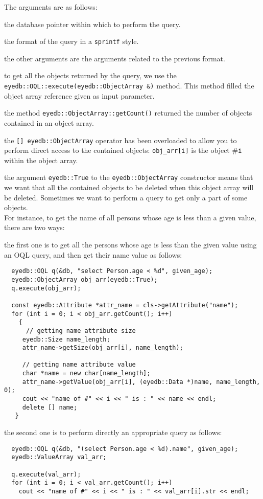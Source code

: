 The arguments are as follows:
\be
\item the database pointer within which to perform the query.
\item the format of the query in a \texttt{sprintf} style.
\item the other arguments are the arguments related to the previous
format.
\ee
\item to get all the objects returned by the query, we use the
\texttt{eyedb::OQL::execute(eyedb::ObjectArray \&)} method. This method filled
the object array reference given as input parameter.
\item the method \texttt{eyedb::ObjectArray::getCount()} returned the number
of objects contained in an object array.
\item the \texttt{[] eyedb::ObjectArray} operator has been overloaded to
allow you to perform direct access to the contained objects: \texttt{obj\_arr[i]} is
the object \#\texttt{i} within the object array.
\item the argument \texttt{eyedb::True} to the \texttt{eyedb::ObjectArray} constructor
means that we want that all the contained objects to be deleted
when this object array will be deleted.
\ee
Sometimes we want to perform a query to get only a part of some objects.
\\
For instance, to get the name of all persons whose age is less than
a given value, there are two ways:
\be
\item the first one is to get all the persons whose age is less
than the given value using an OQL query, and then get their name value
as follows:
\verbsize
\begin{verbatim}
  eyedb::OQL q(&db, "select Person.age < %
  eyedb::ObjectArray obj_arr(eyedb::True);
  q.execute(obj_arr);

  const eyedb::Attribute *attr_name = cls->getAttribute("name");
  for (int i = 0; i < obj_arr.getCount(); i++)
    {
      // getting name attribute size
     eyedb::Size name_length;
     attr_name->getSize(obj_arr[i], name_length);

     // getting name attribute value
     char *name = new char[name_length];
     attr_name->getValue(obj_arr[i], (eyedb::Data *)name, name_length, 0);
     cout << "name of #" << i << " is : " << name << endl;
     delete [] name;
   }  
\end{verbatim}
\normalsize
\item the second one is to perform directly an appropriate query as follows:
\verbsize
\begin{verbatim}
  eyedb::OQL q(&db, "(select Person.age < %
  eyedb::ValueArray val_arr;

  q.execute(val_arr);
  for (int i = 0; i < val_arr.getCount(); i++)
    cout << "name of #" << i << " is : " << val_arr[i].str << endl;
\end{verbatim}
